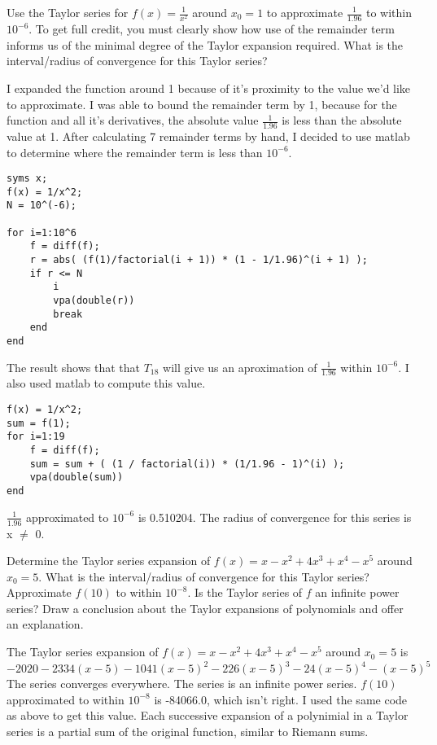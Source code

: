 \documentclass[10pt]{exam}
\begin{document}
\begin{questions}
\question Use the Taylor series for $f(x)=\frac{1}{x^2}$ around $x_0=1$ to approximate $\frac{1}{1.96}$ to within $10^{-6}$.  To get full credit, you must clearly show how use of the remainder term informs us of the minimal degree of the Taylor expansion required.  What is the interval/radius of convergence for this Taylor series?
\begin{solution}
I expanded the function around 1 because of it's proximity to the value we'd like to approximate. I was able
to bound the remainder term by 1, because for the function and all it's derivatives, the absolute value $\frac{1}{1.96}$
is less than the absolute value at 1. After calculating 7 remainder terms by hand, I decided to use matlab to determine
where the remainder term is less than $10^{-6}$.
\begin{lstlisting}
syms x;
f(x) = 1/x^2;
N = 10^(-6);

for i=1:10^6
    f = diff(f);
    r = abs( (f(1)/factorial(i + 1)) * (1 - 1/1.96)^(i + 1) );
    if r <= N
        i
        vpa(double(r))
        break
    end
end
\end{lstlisting}
The result shows that that $T_{\text{18}}$ will give us an aproximation of $\frac{1}{1.96}$ within $10^{-6}$.
I also used matlab to compute this value.
\begin{lstlisting}
f(x) = 1/x^2;
sum = f(1);
for i=1:19
    f = diff(f);
    sum = sum + ( (1 / factorial(i)) * (1/1.96 - 1)^(i) );
    vpa(double(sum))
end
\end{lstlisting}

$\frac{1}{1.96}$ approximated to $10^{-6}$ is 0.510204. The radius of convergence for this series is x $\neq$ 0.



\end{solution}
\question Determine the Taylor series expansion of $f(x) = x-x^2+4x^3+x^4-x^5$ around $x_0=5$.  What is the interval/radius of convergence for this Taylor series?  Approximate $f(10)$ to within $10^{-8}$.  Is the Taylor series of $f$ an infinite power series?  Draw a conclusion about the Taylor expansions of polynomials and offer an explanation.
\begin{solution}
The Taylor series expansion of $f(x) = x-x^2+4x^3+x^4-x^5$ around $x_0=5$ is
$$ -2020 - 2334 (x - 5) - 1041 (x - 5)^2 - 226 (x - 5)^3 - 24 (x - 5)^4 - (x - 5)^5 $$
The series converges everywhere. The series is an infinite power series. $f(10)$ approximated to within $10^{-8}$
is -84066.0, which isn't right. I used the same code as above to get this value. Each successive
expansion of a polynimial in a Taylor series is a partial sum of the original function, similar to
Riemann sums.
\end{solution}
\end{questions}
\end{document}
